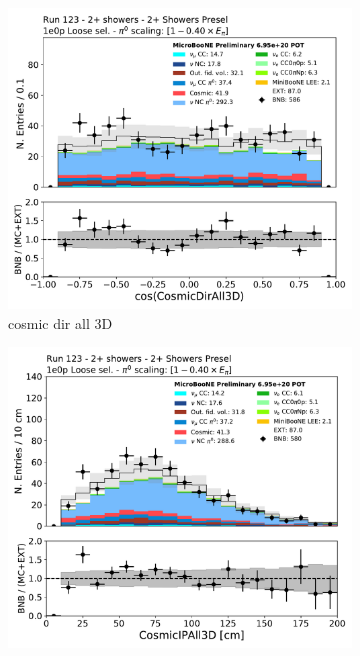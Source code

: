 \begin{figure}[H]
    \centering
    \begin{subfigure}{0.3\textwidth}
    \includegraphics[width=1.0\textwidth]{Sidebands/Figures/TwoShr_1e0pSel/loose/CosmicDirAll3D.pdf}
    \caption{cosmic dir all 3D}
    \end{subfigure}
    \begin{subfigure}{0.3\textwidth}
    \includegraphics[width=1.0\textwidth]{Sidebands/Figures/TwoShr_1e0pSel/loose/CosmicIPAll3D.pdf}

\end{subfigure}
\end{figure}
